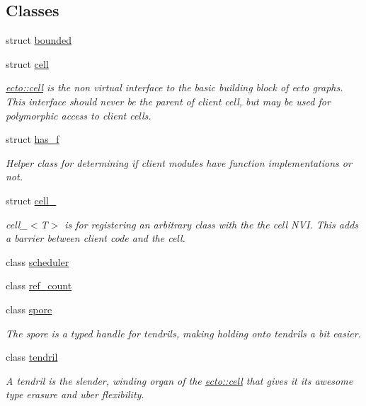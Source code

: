 \subsection*{\-Classes}
\begin{DoxyCompactItemize}
\item 
struct \hyperlink{structecto_1_1bounded}{bounded}
\item 
struct \hyperlink{structecto_1_1cell}{cell}
\begin{DoxyCompactList}\small\item\em \hyperlink{structecto_1_1cell}{ecto\-::cell} is the non virtual interface to the basic building block of ecto graphs. \-This interface should never be the parent of client cell, but may be used for polymorphic access to client cells. \end{DoxyCompactList}\item 
struct \hyperlink{structecto_1_1has__f}{has\-\_\-f}
\begin{DoxyCompactList}\small\item\em \-Helper class for determining if client modules have function implementations or not. \end{DoxyCompactList}\item 
struct \hyperlink{structecto_1_1cell__}{cell\-\_\-}
\begin{DoxyCompactList}\small\item\em cell\-\_\-$<$\-T$>$ is for registering an arbitrary class with the the cell \-N\-V\-I. \-This adds a barrier between client code and the cell. \end{DoxyCompactList}\item 
class \hyperlink{classecto_1_1scheduler}{scheduler}
\item 
class \hyperlink{classecto_1_1ref__count}{ref\-\_\-count}
\item 
class \hyperlink{structecto_1_1spore}{spore}
\begin{DoxyCompactList}\small\item\em \-The spore is a typed handle for tendrils, making holding onto tendrils a bit easier. \end{DoxyCompactList}\item 
class \hyperlink{classecto_1_1tendril}{tendril}
\begin{DoxyCompactList}\small\item\em \-A tendril is the slender, winding organ of the \hyperlink{structecto_1_1cell}{ecto\-::cell} that gives it its awesome type erasure and uber flexibility. \end{DoxyCompactList}\item 

\end{DoxyCompactItemize}
